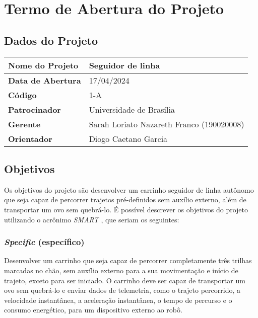 \chapter{Termo de Abertura do Projeto}

\section{Dados do Projeto}

\begin{center}
  \begin{tabular}{|l|l|}
    \hline
    \textbf{Nome do Projeto} & Seguidor de linha \\
    \hline
    \textbf{Data de Abertura} & 17/04/2024 \\
    \hline
    \textbf{Código} & 1-A \\
    \hline
    \textbf{Patrocinador} & Universidade de Brasília \\
    \hline
    \textbf{Gerente} & Sarah Loriato Nazareth Franco (190020008) \\
    \hline
    \textbf{Orientador} & Diogo Caetano Garcia \\
    \hline
  \end{tabular}
\end{center}

\section{Objetivos}

Os objetivos do projeto são desenvolver um carrinho seguidor de linha autônomo
que seja capaz de percorrer trajetos pré-definidos sem auxílio externo, além de
transportar um ovo sem quebrá-lo. É possível descrever os objetivos do projeto
utilizando o acrônimo \textit{SMART}
\cite{University-of-California:SMART-Goals}, que seriam os seguintes:

\subsection{\textit{Specific} (específico)}

Desenvolver um carrinho que seja capaz de percorrer completamente três
trilhas marcadas no chão, sem auxílio externo para a sua movimentação e
início de trajeto, exceto para ser iniciado. O carrinho deve ser capaz de
transportar um ovo sem quebrá-lo e enviar dados de telemetria, como o trajeto
percorrido, a velocidade instantânea, a aceleração instantânea, o tempo de
percurso e o consumo energético, para um dispositivo externo ao robô.
 
